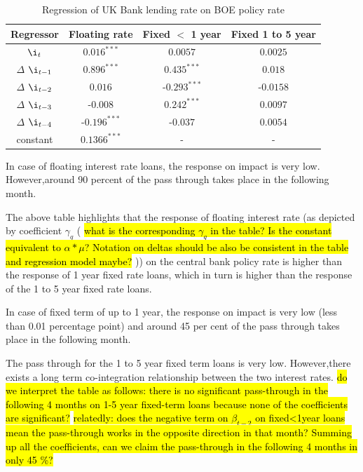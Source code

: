 \documentclass[12pt]{article}
\numberwithin{equation}{section}
\begin{document}
\begin {table}[H]
\caption {Regression of UK Bank lending rate on BOE policy rate} \label{tab:title} 
\begin{center}
	\begin{tabular}{||c c c c  ||} 
		\hline
		Regressor & Floating rate & Fixed $<$ 1 year& Fixed 1 to 5 year \\ [0.5ex] 
		\hline\hline
		$\i_{t}$ & $0.016^{***}$ & $0.0057$& $0.0025$ \\ 
		\hline
		$\Delta$ $\i_{t-1}$& $0.896^{***}$ & $0.435^{***}$& $0.018$  \\ 
		\hline
		 $\Delta$ $\i_{t-2}$&$0.016$ & -$0.293^{***}$& -$0.0158$\\
		
		\hline
	$\Delta$ $\i_{t-3}$	&  -$0.008$ & $0.242^{***}$& $0.0097$ \\
		\hline
		$\Delta$  $\i_{t-4}$&-$0.196^{***}$ &-$0.037$& $0.0054$ \\  
		\hline
		constant&$0.1366^{***}$ & - & -\\ 
			
			\hline
		
		\hline
		
	\end{tabular}

\end{center}

\end {table}



In case of floating interest rate loans, the response on impact is very low. However,around 90 percent of the pass through takes place in the following month.

The above table highlights that the response of floating interest rate (as depicted by coefficient $\gamma_{q}$ ( \hl{what is the corresponding $\gamma_q$ in the table? Is the constant equivalent to $\alpha * \mu$? Notation on deltas should be also be consistent in the table and regression model maybe? }))  on the central bank policy rate is higher than the response of 1 year fixed rate loans, which in turn is higher than the response of the 1 to 5 year fixed rate loans.

 In case of fixed term of up to 1 year, the response on impact is very low (less than 0.01 percentage point) and around 45 per cent of the pass through takes place in the following month. 

The pass through for the 1 to 5 year fixed term loans is very low.  However,there exists a long term co-integration relationship between the two interest rates. \hl{do we interpret the table as follows: there is no significant pass-through in the following 4 months on 1-5 year fixed-term loans because none of the coefficients are significant?  }
\hl{relatedly: does the negative term on $\beta_{t-2}$ on fixed<1year loans mean the pass-through works in the opposite direction in that month? Summing up all the coefficients, can we claim the pass-through in the following 4 months in only 45 \%? }
\end{document}

